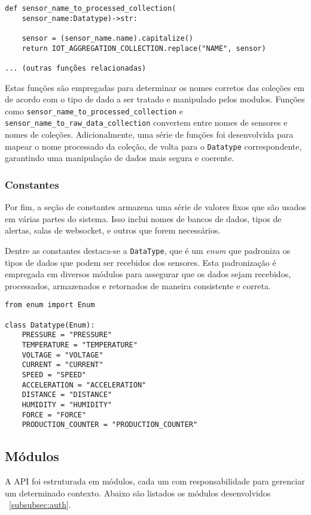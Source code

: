\begin{verbatim}
def sensor_name_to_processed_collection(
    sensor_name:Datatype)->str:
    
    sensor = (sensor_name.name).capitalize()
    return IOT_AGGREGATION_COLLECTION.replace("NAME", sensor)

... (outras funções relacionadas)
\end{verbatim}

Estas funções são empregadas para determinar os nomes corretos das coleções em de acordo com o tipo de dado a ser tratado e manipulado pelos modulos. Funções como \texttt{sensor\_name\_to\_processed\_collection} e \texttt{sensor\_name\_to\_raw\_data\_collection} convertem entre nomes de sensores e nomes de coleções. 
Adicionalmente, uma série de funções foi desenvolvida para mapear o nome processado da coleção, de volta para o \texttt{Datatype} correspondente, garantindo uma manipulação de dados mais segura e coerente.


\subsubsection{Constantes}
Por fim, a seção de constantes armazena uma série de valores fixos que são usados em várias partes do sistema. Isso inclui nomes de bancos de dados, tipos de alertas, salas de websocket, e outros que forem necessários.

Dentre as constantes destaca-se a \texttt{DataType}, que é um \textit{enum} que padroniza os tipos de dados que podem ser recebidos dos sensores. Esta padronização é empregada em diversos módulos para assegurar que os dados sejam recebidos, processados, armazenados e retornados de maneira consistente e correta.

\begin{verbatim}
from enum import Enum

class Datatype(Enum):
    PRESSURE = "PRESSURE"
    TEMPERATURE = "TEMPERATURE"
    VOLTAGE = "VOLTAGE"
    CURRENT = "CURRENT"
    SPEED = "SPEED"
    ACCELERATION = "ACCELERATION"
    DISTANCE = "DISTANCE"
    HUMIDITY = "HUMIDITY"
    FORCE = "FORCE"
    PRODUCTION_COUNTER = "PRODUCTION_COUNTER"
\end{verbatim}

\subsection{Módulos}\label{subsec:modules}
A API foi estruturada em módulos, cada um com responsabilidade para gerenciar um determinado contexto. Abaixo são listados os módulos desenvolvidos ~\ref{subsubsec:auth}.

